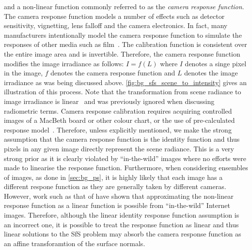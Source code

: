and a non-linear function commonly referred to as the
\textit{camera response function}. The camera response function models a number
of effects such as detector sensitivity, vignetting, lens falloff and the
camera electronics. In fact, many manufacturers intentionally model
the camera response function to simulate the responses of other media
such as film~\cite{grossberg2003space}. The calibration function is consistent
over the entire image area and is invertible. Therefore, the camera response
function modifies the image irradiance as follows: $I = f(L)$ where $I$ denotes
a singe pixel in the image, $f$ denotes the camera response function and $L$
denotes the image irradiance as was being discussed above.
\cref{fig:bg_sfs_scene_to_intensity} gives an illustration of this process. Note
that the transformation from scene radiance to image irradiance is
linear~\cite{horn1979calculating} and was previously ignored when discussing
radiometric terms. Camera response calibration requires acquiring controlled
images of a MacBeth board or other colour chart, or the use of pre-calculated
response model~\cite{grossberg2003space}. Therefore, unless explicitly
mentioned, we make the strong assumption that the camera response function
is the identity function and thus pixels in any given image directly
represent the scene radiance. This is a very strong prior as it is clearly
violated by ``in-the-wild'' images where no efforts were made to linearise
the response function. Furthermore, when considering ensembles of images, as
done in \cref{sec:bg_ps}, it is highly likely that each image has a different
respone function as they are generally taken by different cameras. However,
work such as that of \citet{shi2014photometric} have shown that approximating
the non-linear response function as a linear function is possible from
``in-the-wild'' Internet images. Therefore, although the linear identity
response function assumption is an incorrect one, it is possible to treat
the response function as linear and thus linear solutions to the SfS problem
may absorb the camera response function as an affine transforamtion of the
surface normals.
